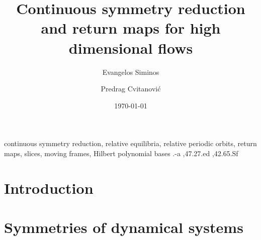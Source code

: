 \documentclass[aps,prl,preprint,superscriptaddress]{revtex4}
\begin{document}
    \ifoldMikTeX %
    \else
{}
\begin{frontmatter}
    \fi          %


			\title{
Continuous symmetry reduction and return maps for high dimensional flows
			}
\author[gatech]{Evangelos Siminos}
\author[gatech]{Predrag Cvitanovi\'c}
\address[gatech]{Center for Nonlinear Science,
School of Physics, Georgia Institute of Technology,
Atlanta, GA 30332-0430}


\date{\today}

\begin{abstract}

\end{abstract}

    \ifoldMikTeX %
    \else
\begin{keyword}
continuous symmetry reduction, 
relative equilibria, 
relative periodic orbits, 
return maps,
slices,
moving frames,
Hilbert polynomial bases
.-a \sep 47.27.ed \sep 42.65.Sf
\end{keyword}
\end{frontmatter}
    \fi %

\section{\label{s:intro} Introduction}
    


\section{\label{s:symDyn} Symmetries of dynamical systems}
    
\end{document}
